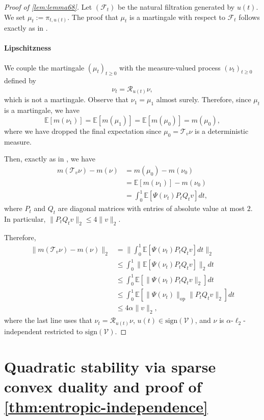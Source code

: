 \documentclass[11pt,reqno,letterpaper]{amsart}
\numberwithin{equation}{section}
\theoremstyle{definition}
\newcommand{\mb}{\mathbb}
\newcommand{\mc}{\mathcal}
\begin{document}
\begin{proof}[Proof of \cref{lem:lemma68}]
Let $(\mathcal{F}_t)$ be the natural filtration generated by $u(t)$. We set $\mu_t:=\pi_{t,u(t)}$. The proof that $\mu_t$ is a martingale with respect to $\mc{F}_t$ follows exactly as in \cite[Proposition~18]{chen2022localization}.\\ 


\paragraph{\bf Lipschitzness}
We couple the martingale $(\mu_t)_{t\geq 0}$ with the measure-valued process $(\nu_t)_{t\geq 0}$ defined by
\[\nu_t = \mathcal{R}_{u(t)}\nu,\]
which is not a martingale. Observe that $\nu_1 = \mu_1$ almost surely. Therefore, since $\mu_t$ is a martingale, we have
\[\mb{E}[m(\nu_1)] = \mb{E}[m(\mu_1)] = \mb{E}[m(\mu_0)] = m(\mu_0),\]
where we have dropped the final expectation since $\mu_0 = \mc{T}_v \nu$ is a deterministic measure. 


Then, exactly as in \cite[Eq~66]{chen2022localization}, we have
\begin{align*}
    m(\mathcal{T}_{v} \nu) - m(\nu) &= m(\mu_0) - m(\nu_0)\\
    &= \mb{E}[m(\nu_1)] - m(\nu_0)\\
    &= \int_{0}^{1} \mb{E}[\Psi(\nu_t) P_t Q_t v]dt,
\end{align*}
where $P_t$ and $Q_t$ are diagonal matrices with entries of absolute value at most $2$. In particular,
$\| P_t Q_t v\|_{2} \leq 4 \|v\|_2$. 

Therefore,
\begin{align*}
    \|m(\mathcal{T}_v \nu) - m(\nu)\|_{2}
    &= \bigg\|\int_{0}^{1} \mb{E}[\Psi(\nu_t) P_t Q_t v]dt\bigg\|_{2}\\
    &\leq \int_{0}^{1} \|\mb{E}[\Psi(\nu_t) P_t Q_t v]\|_{2}dt\\
    &\leq \int_{0}^{1} \mb{E} [\|\Psi(\nu_t) P_t Q_t v\|_{2}]dt\\
    &\leq \int_{0}^{1} \mb{E} [\|\Psi(\nu_t)\|_{\mathrm{op}} \|P_t Q_t v\|_{2}]dt\\
    &\leq 4\alpha \|v\|_2,
\end{align*}
where the last line uses that $\nu_t = \mathcal{R}_{u(t)}\nu$, $u(t) \in \mathrm{sign}(\mathcal{V})$, and $\nu$ is $\alpha$-$\ell_2$-independent restricted to $\mathrm{sign}(\mc{V})$. 
\end{proof}




\section{Quadratic stability via sparse convex duality and proof of \cref{thm:entropic-independence}}\label{sec:quad}
\end{document}

